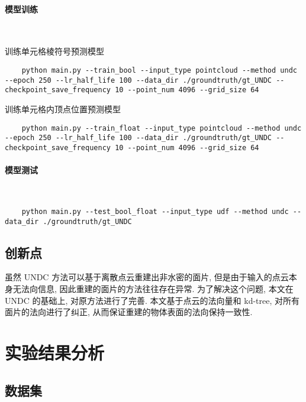 \paragraph{模型训练}~{}

训练单元格棱符号预测模型

\lstset{language=bash}
\begin{lstlisting}
    python main.py --train_bool --input_type pointcloud --method undc --epoch 250 --lr_half_life 100 --data_dir ./groundtruth/gt_UNDC --checkpoint_save_frequency 10 --point_num 4096 --grid_size 64 
\end{lstlisting}

训练单元格内顶点位置预测模型

\lstset{language=bash}
\begin{lstlisting}
    python main.py --train_float --input_type pointcloud --method undc --epoch 250 --lr_half_life 100 --data_dir ./groundtruth/gt_UNDC --checkpoint_save_frequency 10 --point_num 4096 --grid_size 64
\end{lstlisting}

\paragraph{模型测试}~{}

\lstset{language=bash}
\begin{lstlisting}
    python main.py --test_bool_float --input_type udf --method undc --data_dir ./groundtruth/gt_UNDC
\end{lstlisting}

\subsection{创新点}

虽然 UNDC 方法可以基于离散点云重建出非水密的面片, 但是由于输入的点云本身无法向信息, 因此重建的面片的方法往往存在异常. 
为了解决这个问题, 本文在 UNDC 的基础上, 对原方法进行了完善. 本文基于点云的法向量和 kd-tree, 对所有面片的法向进行了纠正, 从而保证重建的物体表面的法向保持一致性. 

\section{实验结果分析}

\subsection{数据集}


